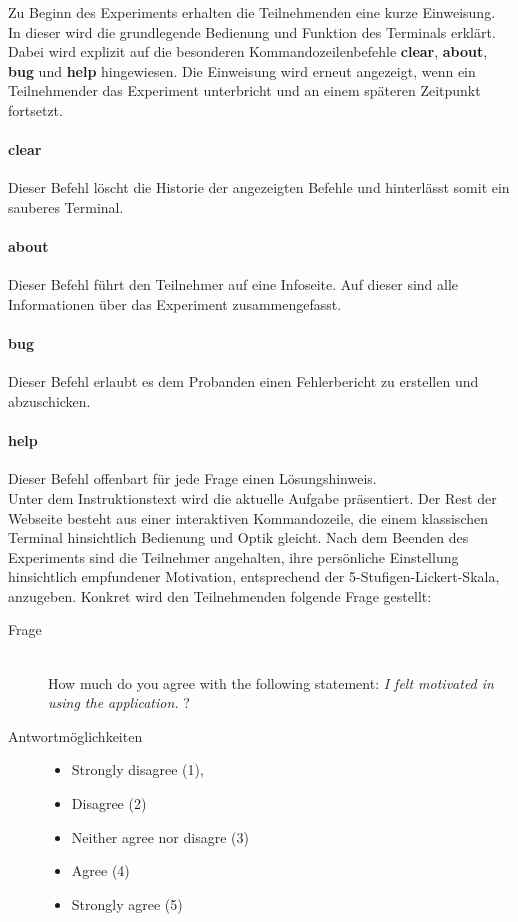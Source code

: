 Zu Beginn des Experiments erhalten die Teilnehmenden eine kurze Einweisung. In dieser wird die grundlegende Bedienung und Funktion des Terminals erklärt. Dabei wird explizit auf die besonderen Kommandozeilenbefehle \textbf{clear}, \textbf{about}, \textbf{bug} und \textbf{help} hingewiesen. Die Einweisung wird erneut angezeigt, wenn ein Teilnehmender das Experiment unterbricht und an einem späteren Zeitpunkt fortsetzt.

\paragraph{clear}
Dieser Befehl löscht die Historie der angezeigten Befehle und hinterlässt somit ein sauberes Terminal.

\paragraph{about}
Dieser Befehl führt den Teilnehmer auf eine Infoseite. Auf dieser sind alle Informationen über das Experiment zusammengefasst.

\paragraph{bug}
Dieser Befehl erlaubt es dem Probanden einen Fehlerbericht zu erstellen und abzuschicken.

\paragraph{help}
Dieser Befehl offenbart für jede Frage einen Lösungshinweis. \\

Unter dem Instruktionstext wird die aktuelle Aufgabe präsentiert. Der Rest der Webseite besteht aus einer interaktiven Kommandozeile, die einem klassischen Terminal hinsichtlich Bedienung und Optik gleicht. Nach dem Beenden des Experiments sind die Teilnehmer angehalten, ihre persönliche Einstellung hinsichtlich empfundener Motivation, entsprechend der 5-Stufigen-Lickert-Skala, anzugeben. Konkret wird den Teilnehmenden folgende Frage gestellt:

\begin{description}
\item[Frage]\hfill \\ How much do you agree with the following statement: \textit{I felt motivated in using the application.} ?
\item[Antwortmöglichkeiten]\hfill 


\begin{itemize}
	 \item Strongly disagree (1),
	 \item Disagree (2)
	 \item Neither agree nor disagre (3)
	 \item Agree (4)
	 \item Strongly agree (5)
\end{itemize}
\end{description}


